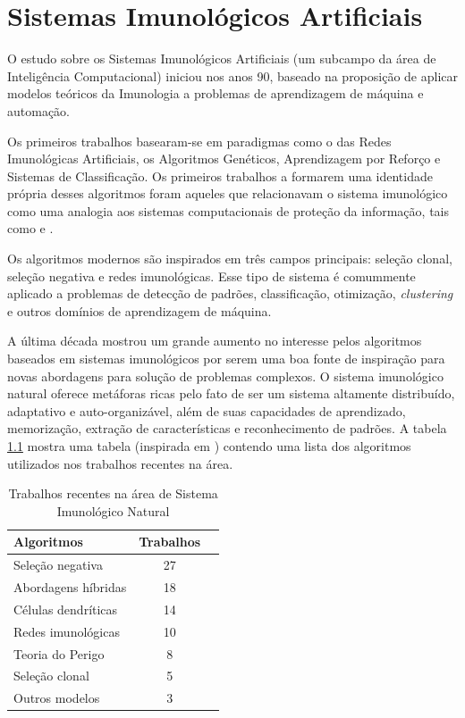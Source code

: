\chapter{Sistemas Imunológicos Artificiais}

O estudo sobre os Sistemas Imunológicos Artificiais (um subcampo da área de Inteligência Computacional) iniciou nos anos 90, baseado na proposição de aplicar modelos teóricos da Imunologia a problemas de aprendizagem de máquina e automação.

Os primeiros trabalhos basearam-se em paradigmas como o das Redes Imunológicas Artificiais, os Algoritmos Genéticos, Aprendizagem por Reforço e Sistemas de Classificação. Os primeiros trabalhos a formarem uma identidade própria desses algoritmos foram aqueles que relacionavam o sistema imunológico como uma analogia aos sistemas computacionais de proteção da informação, tais como \citet{Forrest1994} e \citet{Forrest1997}.

Os algoritmos modernos são inspirados em três campos principais: seleção clonal, seleção negativa e redes imunológicas. Esse tipo de sistema é comummente aplicado a problemas de detecção de padrões, classificação, otimização, \emph{clustering} e outros domínios de aprendizagem de máquina.

A última década mostrou um grande aumento no interesse pelos algoritmos baseados em sistemas imunológicos por serem uma boa fonte de inspiração para novas abordagens para solução de problemas complexos. O sistema imunológico natural oferece metáforas ricas pelo fato de ser um sistema altamente distribuído, adaptativo e auto-organizável, além de suas capacidades de aprendizado, memorização, extração de características e reconhecimento de padrões. A tabela \ref{ais:recent} mostra uma tabela (inspirada em \citet{Dasgupta2010}) contendo uma lista dos algoritmos utilizados nos trabalhos recentes na área.

\begin{table}[h!]
    \vspace{1cm}
    \centering
    \begin{tabular}{l c r}
        \hline
        Algoritmos & Trabalhos   \\
        \hline
        Seleção negativa    & 27 \\
        Abordagens híbridas & 18 \\
        Células dendríticas & 14 \\
        Redes imunológicas  & 10 \\
        Teoria do Perigo    & 8  \\
        Seleção clonal      & 5  \\
        Outros modelos      & 3  \\
        \hline
    \end{tabular}
    \label{ais:recent}
    \caption{Trabalhos recentes na área de Sistema Imunológico Natural \cite{Dasgupta2010}}
    \vspace{1cm}
\end{table}

